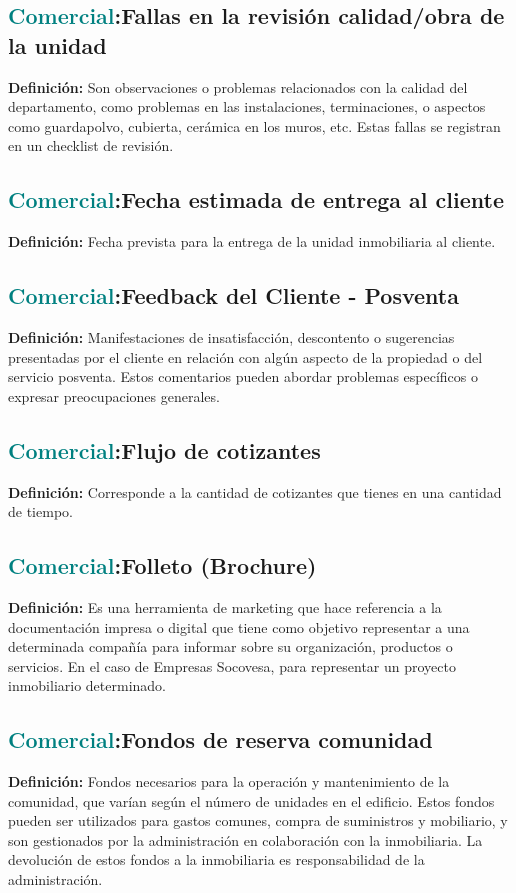 \documentclass[12pt]{article}
\begin{document}
\subsection{\textcolor{teal}{Comercial}:{Fallas en la revisión calidad/obra de la unidad}}
\textbf{Definición:} Son observaciones o problemas relacionados con la calidad del departamento, como problemas en las instalaciones, terminaciones, o aspectos como guardapolvo, cubierta, cerámica en los muros, etc. Estas fallas se registran en un checklist de revisión.
\subsection{\textcolor{teal}{Comercial}:{Fecha estimada de entrega al cliente}}
\textbf{Definición:} Fecha prevista para la entrega de la unidad inmobiliaria al cliente.
\subsection{\textcolor{teal}{Comercial}:{Feedback del Cliente - Posventa}}
\textbf{Definición:} Manifestaciones de insatisfacción, descontento o sugerencias presentadas por el cliente en relación con algún aspecto de la propiedad o del servicio posventa. Estos comentarios pueden abordar problemas específicos o expresar preocupaciones generales.
\subsection{\textcolor{teal}{Comercial}:{Flujo de cotizantes}}
\textbf{Definición:} Corresponde a la cantidad de cotizantes que tienes en una cantidad de tiempo.
\subsection{\textcolor{teal}{Comercial}:{Folleto (Brochure)}}
\textbf{Definición:} Es una herramienta de marketing que hace referencia a la documentación impresa o digital que tiene como objetivo representar a una determinada compañía para informar sobre su organización, productos o servicios. En el caso de Empresas Socovesa, para representar un proyecto inmobiliario determinado.
\subsection{\textcolor{teal}{Comercial}:{Fondos de reserva comunidad}}
\textbf{Definición:} Fondos necesarios para la operación y mantenimiento de la comunidad, que varían según el número de unidades en el edificio. Estos fondos pueden ser utilizados para gastos comunes, compra de suministros y mobiliario, y son gestionados por la administración en colaboración con la inmobiliaria. La devolución de estos fondos a la inmobiliaria es responsabilidad de la administración.
\end{document}
